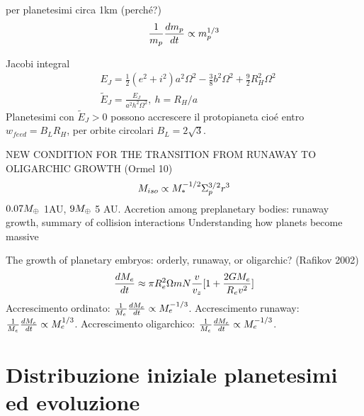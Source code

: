 \begin{workout}
	per planetesimi circa 1km (perch\'e?)
	\begin{equation}
	\frac{1}{m_p}\TDy{t}{m_p}\propto m_p\expy{1/3}
	\end{equation}
\end{workout}
\begin{workout}
	Jacobi integral
	\begin{align}
	&E_J=\frac{1}{2}(e^2+i^2)a^2\Omega^2-\frac{3}{8}b^2\Omega^2+\frac{9}{2}R_H^2\Omega^2\\
	&\tilde{E}_J=\frac{E_J}{a^2h^2\Omega^2},\ h=R_H/a
	\end{align}
	Planetesimi con $\tilde{E}_J>0$ possono accrescere il protopianeta  cio\'e entro $w_{feed}=B_LR_H$, per orbite circolari $B_L=2\sqrt{3 }$.
\end{workout}
\begin{workout}
	NEW CONDITION FOR THE TRANSITION FROM RUNAWAY TO OLIGARCHIC GROWTH (Ormel 10)
	\begin{equation}
	M_{iso}\propto M_*\expy{-1/2}\Sigma_p\expy{3/2}r^3
	\end{equation}
	$0.07\mearth{}$ 1AU, $9\mearth{}$ 5 AU.
	Accretion among preplanetary bodies: runaway growth, summary of collision interactions
	Understanding how planets become massive
\end{workout}
\begin{workout}
	The growth of planetary embryos:  orderly, runaway, or oligarchic? (Rafikov 2002)
	\begin{align}
	\TDy{t}{M_e}\approx\pi R_e^2\Omega mN\frac{v}{v_z}[1+\frac{2GM_e}{R_ev^2}]
	\end{align}
	Accrescimento ordinato: $\frac{1}{M_e}\TDy{t}{M_e}\propto M_e\expy{-1/3}$. Accrescimento runaway: $\frac{1}{M_e}\TDy{t}{M_e}\propto M_e\expy{1/3}$. Accrescimento oligarchico: $\frac{1}{M_e}\TDy{t}{M_e}\propto M_e\expy{-1/3}$.
\end{workout}
\begin{workout}
	
\end{workout}

\section{Distribuzione iniziale planetesimi ed evoluzione}

